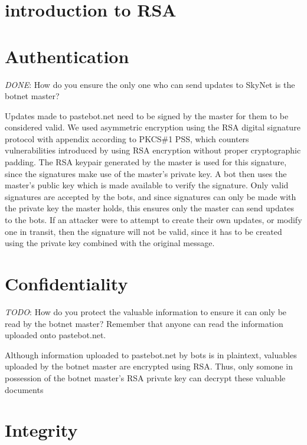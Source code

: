 \documentclass[9pt,a4paper]{article}
\begin{document}
\maketitle
\small
\setlength{\parindent}{0pt}

\section{introduction to RSA}

\section{Authentication}
\emph{DONE}: How do you ensure the only one who can send updates to SkyNet is the botnet master?

Updates made to pastebot.net need to be signed by the master for them to be considered valid. We used asymmetric encryption using the RSA digital signature protocol with appendix according to PKCS\#1 PSS, which counters vulnerabilities introduced by using RSA encryption without proper cryptographic padding. The RSA keypair generated by the master is used for this signature, since the signatures make use of the master's private key. A bot then uses the master's public key which is made available to verify the signature. Only valid signatures are accepted by the bots, and since signatures can only be made with the private key the master holds, this ensures only the master can send updates to the bots. If an attacker were to attempt to create their own updates, or modify one in transit, then the signature will not be valid, since it has to be created using the private key combined with the original message.

\section{Confidentiality}
\emph{TODO}: How do you protect the valuable information to ensure it can only  be read by the botnet master? Remember that anyone can read the  information uploaded onto pastebot.net.

Although information uploaded to pastebot.net by bots is in plaintext, valuables uploaded by the botnet master are encrypted using RSA. Thus, only somone in possession of the botnet master's RSA private key can decrypt these valuable documents

\section{Integrity}
\end{document}

